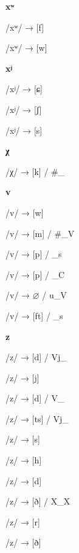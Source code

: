 \begin{center}\textbf{xʷ}\end{center}
\begin{multicols}{4}
\noindent /xʷ/ → [f]

\noindent /xʷ/ → [w]

\end{multicols}

\begin{center}\textbf{xʲ}\end{center}
\begin{multicols}{4}
\noindent /xʲ/ → [ɕ]

\noindent /xʲ/ → [ʃ]

\noindent /xʲ/ → [s]

\end{multicols}

\begin{center}\textbf{χ}\end{center}
\begin{multicols}{4}
\noindent /χ/ → [k] / \#\_

\end{multicols}

\begin{center}\textbf{v}\end{center}
\begin{multicols}{4}
\noindent /v/ → [w]

\noindent /v/ → [m] / \#\_V

\noindent /v/ → [p] / \_s

\noindent /v/ → [p] / \_C

\noindent /v/ → $\varnothing$ / u\_V

\noindent /v/ → [ft] / \_s

\end{multicols}

\begin{center}\textbf{z}\end{center}
\begin{multicols}{4}
\noindent /z/ → [d] / Vj\_

\noindent /z/ → [j]

\noindent /z/ → [d] / V\_

\noindent /z/ → [ts] / Vj\_

\noindent /z/ → [s]

\noindent /z/ → [h]

\noindent /z/ → [d]

\noindent /z/ → [ð] / X\_X

\noindent /z/ → [r]

\noindent /z/ → [ð]

\end{multicols}

